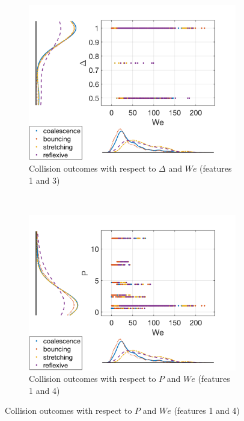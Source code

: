 \documentclass{article}
\begin{document}
\begin{figure}[h!]
    \centering
    \begin{subfigure}[b]{0.4\textwidth}
        \includegraphics[width=\textwidth]{figures/data_scatterhist1.png}
        \caption{\centering Collision outcomes with respect to $\Delta$ and $We$ (features 1 and 3)}
        \label{fig:data1}
    \end{subfigure}
    ~ %
    \begin{subfigure}[b]{0.4\textwidth}
        \includegraphics[width=\textwidth]{figures/data_scatterhist2.png}
        \caption{\centering Collision outcomes with respect to $P$ and $We$ (features 1 and 4)}

\end{subfigure}
\end{figure}
\end{document}
